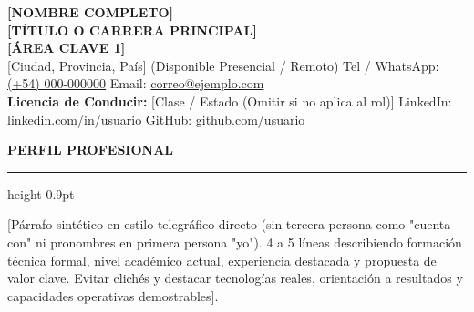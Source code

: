 \documentclass[10pt,a4paper]{article}
\newcommand{\cvsection}[1]{%
  \vspace{5pt}%
  {\color{primary}\large\bfseries\MakeUppercase{#1}}\par\vspace{1.5pt}%
  {\color{secondary}\hrule height 0.9pt}\par\vspace{3pt}%
}
\begin{document}
\color{darktext}

\begin{center}
    {\fontsize{21}{25}\selectfont \bfseries \color{primary} [NOMBRE COMPLETO]} \\[2.5pt]
    {\normalsize \bfseries \color{darktext} [TÍTULO O CARRERA PRINCIPAL] \quad \textbar {}} \\[2.0pt]
    {\footnotesize \bfseries \color{secondary} [ÁREA CLAVE 1] \quad \textbar {} \quad \textbar {}} \\[3.5pt]
    
    \footnotesize
    [Ciudad, Provincia, País] (Disponible Presencial / Remoto) \quad \textbar \quad
    Tel / WhatsApp: \href{tel:+549000000000}{(+54) 000-000000} \quad \textbar \quad
    Email: \href{mailto:correo@ejemplo.com}{correo@ejemplo.com} \\
    \textbf{Licencia de Conducir:} [Clase / Estado (Omitir si no aplica al rol)] \quad \textbar \quad
    LinkedIn: \href{https://linkedin.com/in/usuario}{linkedin.com/in/usuario} \quad \textbar \quad
    GitHub: \href{https://github.com/usuario}{github.com/usuario}
\end{center}

\vspace{-1pt}

\cvsection{Perfil Profesional}
[Párrafo sintético en estilo telegráfico directo (sin tercera persona como "cuenta con" ni pronombres en primera persona "yo"). 4 a 5 líneas describiendo formación técnica formal, nivel académico actual, experiencia destacada y propuesta de valor clave. Evitar clichés y destacar tecnologías reales, orientación a resultados y capacidades operativas demostrables].
\end{document}
